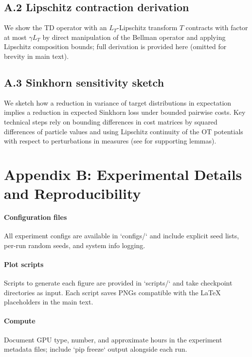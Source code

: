 \documentclass{article}
\begin{document}
\subsection{A.2 Lipschitz contraction derivation}
We show the TD operator with an $L_T$-Lipschitz transform $T$ contracts with factor at most $\gamma L_T$ by direct manipulation of the Bellman operator and applying Lipschitz composition bounds; full derivation is provided here (omitted for brevity in main text).

\subsection{A.3 Sinkhorn sensitivity sketch}
We sketch how a reduction in variance of target distributions in expectation implies a reduction in expected Sinkhorn loss under bounded pairwise costs. Key technical steps rely on bounding differences in cost matrices by squared differences of particle values and using Lipschitz continuity of the OT potentials with respect to perturbations in measures (see \cite{feydy2019interpolating} for supporting lemmas).

\section{Appendix B: Experimental Details and Reproducibility}
\paragraph{Configuration files} All experiment configs are available in `configs/` and include explicit seed lists, per-run random seeds, and system info logging.
\paragraph{Plot scripts} Scripts to generate each figure are provided in `scripts/` and take checkpoint directories as input. Each script saves PNGs compatible with the LaTeX placeholders in the main text.
\paragraph{Compute} Document GPU type, number, and approximate hours in the experiment metadata files; include `pip freeze` output alongside each run.
\end{document}
